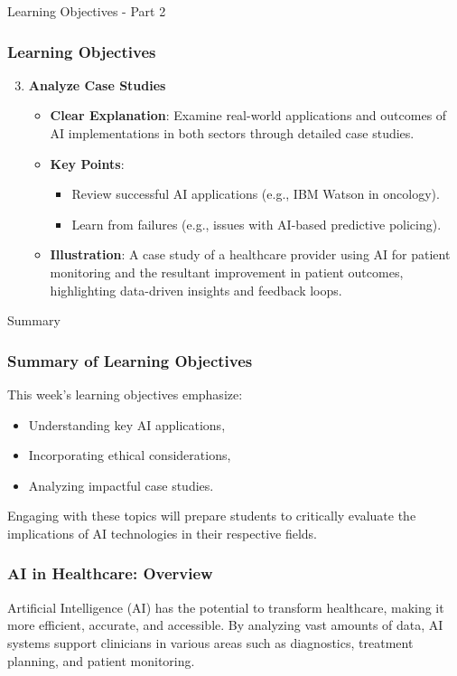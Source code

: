 \documentclass[aspectratio=169]{beamer}
\begin{document}
\begin{frame}[fragile]{Learning Objectives - Part 2}
    \frametitle{Learning Objectives}
    
    \begin{enumerate}
        \setcounter{enumi}{2} %
        \item \textbf{Analyze Case Studies}
            \begin{itemize}
                \item \textbf{Clear Explanation}: Examine real-world applications and outcomes of AI implementations in both sectors through detailed case studies.
                \item \textbf{Key Points}:
                    \begin{itemize}
                        \item Review successful AI applications (e.g., IBM Watson in oncology).
                        \item Learn from failures (e.g., issues with AI-based predictive policing).
                    \end{itemize}
                \item \textbf{Illustration}: A case study of a healthcare provider using AI for patient monitoring and the resultant improvement in patient outcomes, highlighting data-driven insights and feedback loops.
            \end{itemize}
    \end{enumerate}
\end{frame}

\begin{frame}[fragile]{Summary}
    \frametitle{Summary of Learning Objectives}
    This week’s learning objectives emphasize:
    
    \begin{itemize}
        \item Understanding key AI applications,
        \item Incorporating ethical considerations,
        \item Analyzing impactful case studies.
    \end{itemize}
    
    Engaging with these topics will prepare students to critically evaluate the implications of AI technologies in their respective fields.
\end{frame}

\begin{frame}[fragile]
    \frametitle{AI in Healthcare: Overview}
    Artificial Intelligence (AI) has the potential to transform healthcare, making it more efficient, accurate, and accessible. By analyzing vast amounts of data, AI systems support clinicians in various areas such as diagnostics, treatment planning, and patient monitoring.
\end{frame}
\end{document}
